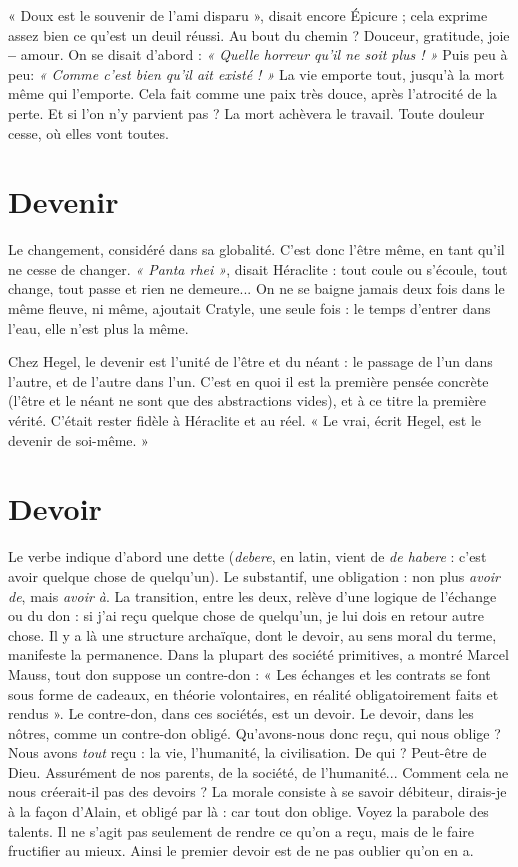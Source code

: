 « Doux est le souvenir de l’ami disparu », disait encore Épicure ; cela
exprime assez bien ce qu’est un deuil réussi. Au bout du chemin ? Douceur,
gratitude, joie {\bf --} amour. On se disait d’abord : {\it « Quelle horreur qu'il ne soit
plus ! »} Puis peu à peu: {\it « Comme c'est bien qu'il ait existé ! »} La vie emporte
tout, jusqu’à la mort même qui l’emporte. Cela fait comme une paix très
douce, après l’atrocité de la perte. Et si l’on n’y parvient pas ? La mort achèvera
le travail. Toute douleur cesse, où elles vont toutes.

\section{Devenir}
Le changement, considéré dans sa globalité. C’est donc l'être même,
en tant qu'il ne cesse de changer. {\it « Panta rhei »}, disait Héraclite :
tout coule ou s'écoule, tout change, tout passe et rien ne demeure... On ne se
baigne jamais deux fois dans le même fleuve, ni même, ajoutait Cratyle, une seule
fois : le temps d’entrer dans l’eau, elle n’est plus la même.

Chez Hegel, le devenir est l’unité de l’être et du néant : le passage de l’un
dans l’autre, et de l’autre dans l’un. C’est en quoi il est la première pensée
concrète (l'être et le néant ne sont que des abstractions vides), et à ce titre la
première vérité. C'était rester fidèle à Héraclite et au réel. « Le vrai, écrit Hegel,
est le devenir de soi-même. »

\section{Devoir}
Le verbe indique d’abord une dette ({\it debere}, en latin, vient de {\it de
habere} : c’est avoir quelque chose de quelqu’un). Le substantif, une
obligation : non plus {\it avoir de}, mais {\it avoir à}. La transition, entre les deux, relève
d’une logique de l'échange ou du don : si j’ai reçu quelque chose de quelqu'un,
je lui dois en retour autre chose. Il y a là une structure archaïque, dont le
devoir, au sens moral du terme, manifeste la permanence. Dans la plupart des
société primitives, a montré Marcel Mauss, tout don suppose un contre-don :
« Les échanges et les contrats se font sous forme de cadeaux, en théorie volontaires,
en réalité obligatoirement faits et rendus ». Le contre-don, dans ces
sociétés, est un devoir. Le devoir, dans les nôtres, comme un contre-don obligé.
Qu’avons-nous donc reçu, qui nous oblige ? Nous avons {\it tout} reçu : la vie,
l'humanité, la civilisation. De qui ? Peut-être de Dieu. Assurément de nos
parents, de la société, de l'humanité... Comment cela ne nous créerait-il pas
des devoirs ? La morale consiste à se savoir débiteur, dirais-je à la façon d’Alain,
et obligé par là : car tout don oblige. Voyez la parabole des talents. Il ne s’agit
pas seulement de rendre ce qu’on a reçu, mais de le faire fructifier au mieux.
Ainsi le premier devoir est de ne pas oublier qu’on en a.

